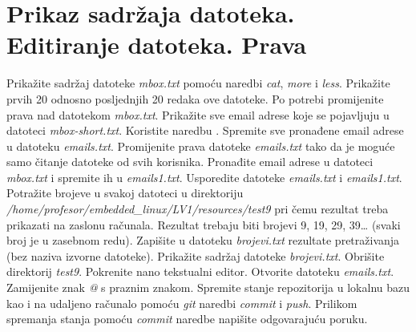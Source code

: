 \documentclass[11pt]{article}
\begin{document}
\section{Prikaz sadržaja datoteka. Editiranje datoteka. Prava}
Prikažite sadržaj datoteke \textit{mbox.txt} pomoću naredbi \textit{cat},
 \textit{more} i \textit{less}. Prikažite prvih 20 odnosno posljednjih 20
 redaka ove datoteke. Po potrebi promijenite prava nad datotekom
 \textit{mbox.txt}.
\newline
\newline
Prikažite sve email adrese koje se pojavljuju u datoteci
\textit{mbox-short.txt}. Koristite naredbu .
Spremite sve pronađene email adrese u datoteku
 \textit{emails.txt}. Promijenite prava datoteke \textit{emails.txt} tako da je
 moguće samo čitanje datoteke od svih korisnika.
\newline
\newline
Pronađite email adrese u datoteci \textit{mbox.txt} i spremite ih u
 \textit{emails1.txt}. Usporedite datoteke \textit{emails.txt} i
 \textit{emails1.txt}. Potražite brojeve u svakoj datoteci u direktoriju \\
 \textit{/home/profesor/embedded\_linux/LV1/resources/test9} pri čemu rezultat
 treba prikazati na zaslonu računala. Rezultat trebaju biti brojevi 9, 19, 29,
 39… (svaki broj je u zasebnom redu). Zapišite u datoteku \textit{brojevi.txt}
 rezultate pretraživanja (bez naziva izvorne datoteke). Prikažite sadržaj
 datoteke \textit{brojevi.txt}. Obrišite direktorij \textit{test9}.
\newline
\newline
Pokrenite nano tekstualni editor. Otvorite datoteku \textit{emails.txt}.
 Zamijenite znak \textit{@} s praznim znakom.
\newline
\newline
Spremite stanje repozitorija u lokalnu bazu kao i na udaljeno računalo pomoću
 \textit{git} naredbi \textit{commit} i \textit{push}. Prilikom spremanja
 stanja pomoću \textit{commit} naredbe napišite odgovarajuću poruku.
\end{document}
